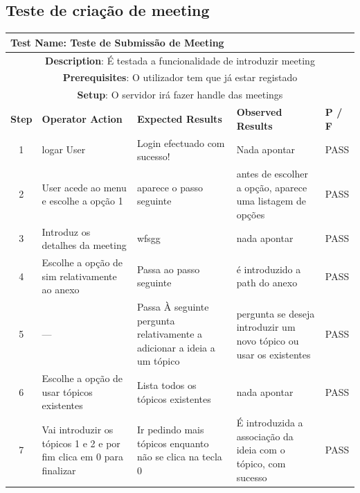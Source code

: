 \documentclass[12pt]{article} %
\begin{document}
\subsection{Teste de criação de meeting}
\begin{table}[ht!]
	\begin{tabular}{|c|p{4cm}|p{4cm}|p{3cm}|p{1cm}|}
		\hline
		\multicolumn{5}{|l|}{\textbf{Test Name}: Teste de Submissão de Meeting}\\
		\hline
		\multicolumn{5}{|p{14,5cm}|}{\textbf{Description}: É testada a funcionalidade de introduzir meeting}\\
		\hline
		\multicolumn{5}{|p{14,5cm}|}{\textbf{Prerequisites}: O utilizador tem que já estar registado}\\
		\hline
		\multicolumn{5}{|p{14,5cm}|}{\textbf{Setup}: O servidor irá fazer handle das meetings}\\
		\hline
		\textbf{Step} & \textbf{Operator Action} & \textbf{Expected Results} & \textbf{Observed Results} & \textbf{P / F}\\
		\hline
		1 & logar User & Login efectuado com sucesso! & Nada apontar & PASS\\
		\hline
		2 & User acede ao menu e escolhe a opção 1 & aparece o passo seguinte & antes de escolher a opção, aparece uma listagem de opções & PASS\\
		\hline
		3 & Introduz os detalhes da meeting & wfsgg & nada apontar & PASS\\
		\hline
		4 & Escolhe a opção de sim relativamente ao anexo & Passa ao passo seguinte & é introduzido a path do anexo & PASS\\
		\hline
		5 & --- & Passa À seguinte pergunta relativamente a adicionar a ideia a um tópico & pergunta se deseja introduzir um novo tópico ou usar os existentes & PASS\\
		\hline
		6 & Escolhe a opção de usar tópicos existentes & Lista todos os tópicos existentes & nada apontar & PASS\\
		\hline
		7 & Vai introduzir os tópicos 1 e 2 e por fim clica em 0 para finalizar & Ir pedindo mais tópicos enquanto não se clica na tecla 0 & É introduzida a associação da ideia com o tópico, com sucesso & PASS\\
		\hline
	\end{tabular}
\end{table}
\pagebreak



\end{document}
